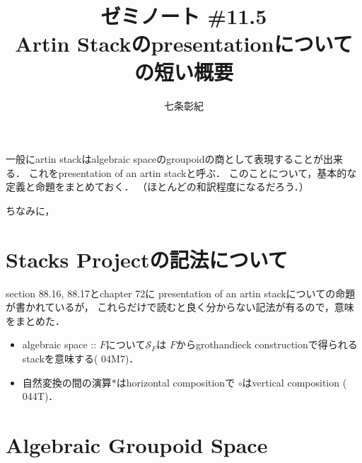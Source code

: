 \documentclass[a4paper, dvipdfmx]{jsarticle}
\begin{document}
\title{ゼミノート \#11.5 \\ Artin Stackのpresentationについての短い概要}
\author{七条彰紀}
\maketitle
\tableofcontents
\vspace{10pt}

一般にartin stackはalgebraic spaceのgroupoidの商として表現することが出来る．
これをpresentation of an artin stackと呼ぶ．
このことについて，基本的な定義と命題をまとめておく．
（ほとんど\cite{SP}の和訳程度になるだろう．）

ちなみに，

\section*{Stacks Projectの記法について}
    \cite{SP} section 88.16, 88.17とchapter 72に
    presentation of an artin stackについての命題が書かれているが，
    これらだけで読むと良く分からない記法が有るので，意味をまとめた．

    \begin{itemize}
    \item 
        algebraic space :: $F$について$\mathcal{S}_F$は
        $F$からgrothandieck constructionで得られるstackを意味する(\cite{SP} 04M7)．

    \item
        自然変換の間の演算$\ast$はhorizontal compositionで
        $\circ$はvertical composition (\cite{SP} 044T)．
    \end{itemize}

\section{Algebraic Groupoid Space}
\newpage
\end{document}
